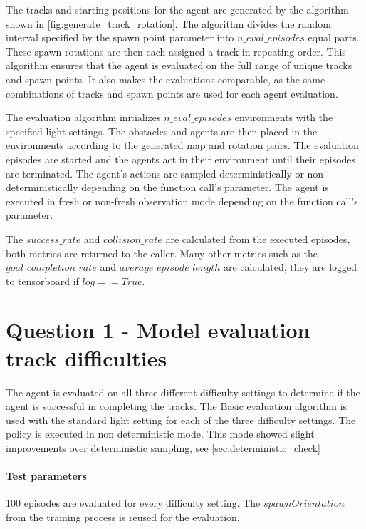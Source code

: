 The tracks and starting positions for the agent are generated by the algorithm shown in \ref{fig:generate_track_rotation}. The algorithm divides the random interval specified by the spawn point parameter into $n\_eval\_episodes$ equal parts. These spawn rotations are then each assigned a track in repeating order.
This algorithm ensures that the agent is evaluated on the full range of unique tracks and spawn points.
It also makes the evaluations comparable, as the same combinations of tracks and spawn points are used for each agent evaluation.

The evaluation algorithm initializes $n\_eval\_episodes$ environments with the specified light settings. The obstacles and agents are then placed in the environments according to the generated map and rotation pairs. The evaluation episodes are started and the agents act in their environment until their episodes are terminated. The agent's actions are sampled deterministically or non-deterministically depending on the function call's parameter. The agent is executed in fresh or non-fresh observation mode depending on the function call's parameter.

The $success\_rate$ and $collision\_rate$ are calculated from the executed episodes, both metrics are returned to the caller. Many other metrics such as the $goal\_completion\_rate$ and $average\_episode\_length$ are calculated, they are logged to tensorboard if $log==True$.


\section{Question 1 - Model evaluation track difficulties}

The agent is evaluated on all three different difficulty settings to determine if the agent is successful in completing the tracks.
The Basic evaluation algorithm is used with the standard light setting for each of the three difficulty settings.
The policy is executed in non deterministic mode. This mode showed slight improvements over deterministic sampling, see \ref{sec:deterministic_check}



\paragraph{Test parameters}

100 episodes are evaluated for every difficulty setting. The $spawnOrientation$ from the training process is reused for the evaluation.


